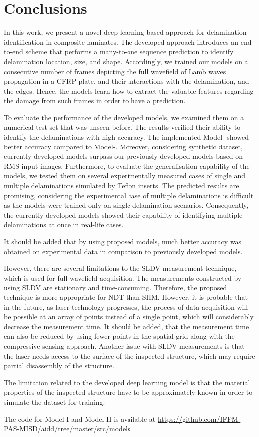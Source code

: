 \section{Conclusions}
\label{conclusion}
\begin{sloppypar}
	In this work, we present a novel deep learning-based approach for delamination identification in composite laminates.
	The developed approach introduces an end-to-end scheme that performs a many-to-one sequence prediction to identify delamination location, size, and shape.
	Accordingly, we trained our models on a consecutive number of frames depicting the full wavefield of Lamb waves propagation in a CFRP plate, and their interactions with the delamination, and the edges.
	Hence, the models learn how to extract the valuable features regarding the damage from such frames in order to have a prediction.
	
	To evaluate the performance of the developed models, we examined them on a numerical test-set that was unseen before.
	The results verified their ability to identify the delaminations with high accuracy. 
	The implemented Model- showed better accuracy compared to Model-.
	Moreover, considering synthetic dataset, currently developed models surpass our previously developed models based on RMS input images.
	Furthermore, to evaluate the generalisation capability of the models, we tested them on several experimentally measured cases of single and multiple delaminations simulated by Teflon inserts.
	The predicted results are promising, considering the experimental case of multiple delaminations is difficult as the models were trained only on single delamination scenarios.
	Consequently, the currently developed models showed their capability of identifying multiple delaminations at once in real-life cases.
	
	It should be added that by using proposed models, much better accuracy was obtained on experimental data in comparison to previously developed models.
	
	However, there are several limitations to the SLDV measurement technique, which is used for full wavefield acquisition.
	The measurements constructed by using SLDV are stationary and time-consuming.
	Therefore, the proposed technique is more appropriate for NDT than SHM.
	However, it is probable that in the future, as laser technology progresses, the process of data acquisition will be possible at an array of points instead of a single point, which will considerably decrease the measurement time.
	It should be added, that the measurement time can also be reduced by using fewer points in the spatial grid along with the compressive sensing approach.
	Another issue with SLDV measurements is that the laser needs access to the surface of the inspected structure, which may require partial disassembly of the structure.
	
	The limitation related to the developed deep learning model is that the material properties of the inspected structure have to be approximately known in order to simulate the dataset for training.
	
	The code for Model-I and Model-II is available at \url{https://github.com/IFFM-PAS-MISD/aidd/tree/master/src/models}.
\end{sloppypar}

